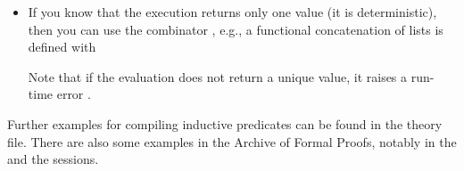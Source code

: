 \begin{isabellebody}
\begin{isamarkuptext}
\begin{itemize}
      \begin{quote}
         \\
      \end{quote}

    \item If you know that the execution returns only one value (it is
      deterministic), then you can use the combinator , e.g., a functional concatenation of lists is
      defined with

      \begin{quote}
      \end{quote}

      Note that if the evaluation does not return a unique value, it
      raises a run-time error .

  \end{itemize}%
\end{isamarkuptext}%
\isamarkuptrue%
%
\isamarkuptrue%
%
\begin{isamarkuptext}%
Further examples for compiling inductive predicates can be found in
  the  theory file.  There are
  also some examples in the Archive of Formal Proofs, notably in the
   and the 
  sessions.%
\end{isamarkuptext}%
\isamarkuptrue%
%
\isadelimtheory
%
\endisadelimtheory
%
\isatagtheory
{}\isamarkupfalse%
%
\endisatagtheory
{\isafoldtheory}%
%
\isadelimtheory
%
\endisadelimtheory
\isanewline
\end{isabellebody}%
